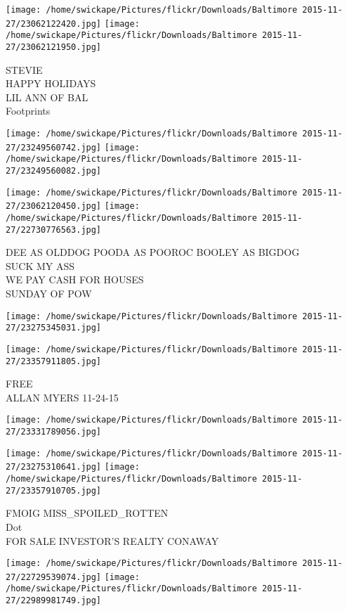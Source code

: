 \documentclass[10pt,letterpaper]{article}
\begin{document}
\texttt{[image: /home/swickape/Pictures/flickr/Downloads/Baltimore 2015-11-27/23062122420.jpg]}
\texttt{[image: /home/swickape/Pictures/flickr/Downloads/Baltimore 2015-11-27/23062121950.jpg]}

STEVIE\\
HAPPY HOLIDAYS\\
LIL ANN OF BAL\\
Footprints
\pagebreak

\texttt{[image: /home/swickape/Pictures/flickr/Downloads/Baltimore 2015-11-27/23249560742.jpg]}
\texttt{[image: /home/swickape/Pictures/flickr/Downloads/Baltimore 2015-11-27/23249560082.jpg]}

\texttt{[image: /home/swickape/Pictures/flickr/Downloads/Baltimore 2015-11-27/23062120450.jpg]}
\texttt{[image: /home/swickape/Pictures/flickr/Downloads/Baltimore 2015-11-27/22730776563.jpg]}

DEE AS OLDDOG POODA AS POOROC BOOLEY AS BIGDOG\\
SUCK MY ASS\\
WE PAY CASH FOR HOUSES\\
SUNDAY OF POW
\pagebreak

\texttt{[image: /home/swickape/Pictures/flickr/Downloads/Baltimore 2015-11-27/23275345031.jpg]}

\vspace{0.25in}
\texttt{[image: /home/swickape/Pictures/flickr/Downloads/Baltimore 2015-11-27/23357911805.jpg]}

FREE\\
ALLAN MYERS 11{-}24{-}15
\pagebreak

\texttt{[image: /home/swickape/Pictures/flickr/Downloads/Baltimore 2015-11-27/23331789056.jpg]}

\vspace{0.25in}
\texttt{[image: /home/swickape/Pictures/flickr/Downloads/Baltimore 2015-11-27/23275310641.jpg]}
\texttt{[image: /home/swickape/Pictures/flickr/Downloads/Baltimore 2015-11-27/23357910705.jpg]}

FMOIG MISS\_SPOILED\_ROTTEN\\
Dot\\
FOR  SALE INVESTOR'S REALTY CONAWAY
\pagebreak

\texttt{[image: /home/swickape/Pictures/flickr/Downloads/Baltimore 2015-11-27/22729539074.jpg]}
\texttt{[image: /home/swickape/Pictures/flickr/Downloads/Baltimore 2015-11-27/22989981749.jpg]}
\end{document}

